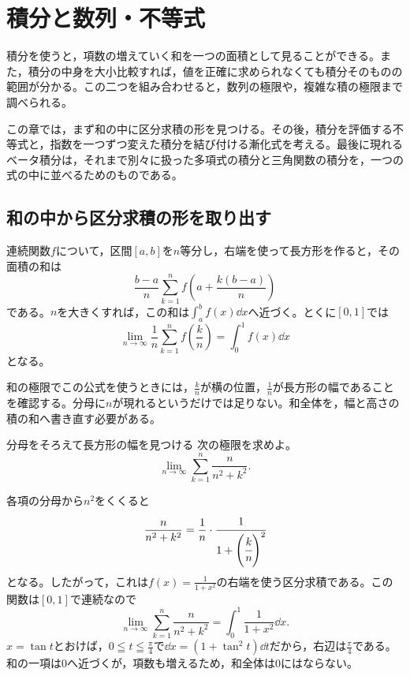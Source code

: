 \chapter{積分と数列・不等式}\label{章:積分と数列}

積分を使うと，項数の増えていく和を一つの面積として見ることができる。また，積分の中身を大小比較すれば，値を正確に求められなくても積分そのものの範囲が分かる。この二つを組み合わせると，数列の極限や，複雑な積の極限まで調べられる。

この章では，まず和の中に区分求積の形を見つける。その後，積分を評価する不等式と，指数を一つずつ変えた積分を結び付ける漸化式を考える。最後に現れるベータ積分は，それまで別々に扱った多項式の積分と三角関数の積分を，一つの式の中に並べるためのものである。

\section{和の中から区分求積の形を取り出す}\label{節:和の区分求積}

連続関数$f$について，区間$[a,b]$を$n$等分し，右端を使って長方形を作ると，その面積の和は
\[
 \frac{b-a}{n}\sum_{k=1}^{n}
 f\left(a+\frac{k(b-a)}{n}\right)
\]
である。$n$を大きくすれば，この和は$\int_a^b f(x)\dd x$へ近づく。とくに$[0,1]$では
\begin{equation}\label{式:単位区間の区分求積}
 \lim_{n\to\infty}\frac1n\sum_{k=1}^{n}f\left(\frac{k}{n}\right)
 =\int_0^1 f(x)\dd x
\end{equation}
となる。

和の極限でこの公式を使うときには，$\frac{k}{n}$が横の位置，$\frac1n$が長方形の幅であることを確認する。分母に$n$が現れるというだけでは足りない。和全体を，幅と高さの積の和へ書き直す必要がある。

\begin{example}{分母をそろえて長方形の幅を見つける}
次の極限を求めよ。
\[
 \lim_{n\to\infty}\sum_{k=1}^{n}\frac{n}{n^2+k^2}.
\]
\end{example}

各項の分母から$n^2$をくくると
\[
 \frac{n}{n^2+k^2}
 =\frac1n\cdot\cfrac{1}{1+\left(\cfrac{k}{n}\right)^2}
\]
となる。したがって，これは$f(x)=\frac1{1+x^2}$の右端を使う区分求積である。この関数は$[0,1]$で連続なので
\[
 \lim_{n\to\infty}\sum_{k=1}^{n}\frac{n}{n^2+k^2}
 =\int_0^1\frac{1}{1+x^2}\dd x.
\]
$x=\tan t$とおけば，$0\leqq t\leqq\frac{\pi}{4}$で$\dd x=(1+\tan^2t)\dd t$だから，右辺は$\frac{\pi}{4}$である。和の一項は$0$へ近づくが，項数も増えるため，和全体は$0$にはならない。

